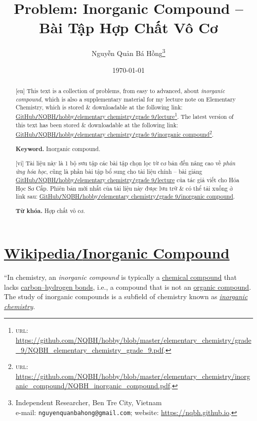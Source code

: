 \documentclass{article}
\title{Problem: Inorganic Compound -- Bài Tập Hợp Chất Vô Cơ}
\author{Nguyễn Quản Bá Hồng\footnote{Independent Researcher, Ben Tre City, Vietnam\\e-mail: \texttt{nguyenquanbahong@gmail.com}; website: \url{https://nqbh.github.io}.}}
\date{\today}
\begin{document}
\maketitle
\begin{abstract}
	\textsf{[en]} This text is a collection of problems, from easy to advanced, about \textit{inorganic compound}, which is also a supplementary material for my lecture note on Elementary Chemistry, which is stored \& downloadable at the following link: \href{https://github.com/NQBH/hobby/blob/master/elementary_chemistry/grade_9/NQBH_elementary_chemistry_grade_9.pdf}{GitHub\texttt{/}NQBH\texttt{/}hobby\texttt{/}elementary chemistry\texttt{/}grade 9\texttt{/}lecture}\footnote{\textsc{url}: \url{https://github.com/NQBH/hobby/blob/master/elementary_chemistry/grade_9/NQBH_elementary_chemistry_grade_9.pdf}.}. The latest version of this text has been stored \& downloadable at the following link: \href{https://github.com/NQBH/hobby/blob/master/elementary_chemistry/inorganic_compound/NQBH_inorganic_compound.pdf}{GitHub\texttt{/}NQBH\texttt{/}hobby\texttt{/}elementary chemistry\texttt{/}grade 9\texttt{/}inorganic compound}\footnote{\textsc{url}: \url{https://github.com/NQBH/hobby/blob/master/elementary_chemistry/inorganic_compound/NQBH_inorganic_compound.pdf}.}.
	
	\textsf{\textbf{Keyword.} Inorganic compound.}
	\vspace{2mm}
	
	\textsf{[vi]} Tài liệu này là 1 bộ sưu tập các bài tập chọn lọc từ cơ bản đến nâng cao về \textit{phản ứng hóa học}, cũng là phần bài tập bổ sung cho tài liệu chính -- bài giảng \href{https://github.com/NQBH/hobby/blob/master/elementary_chemistry/grade_9/NQBH_elementary_chemistry_grade_9.pdf}{GitHub\texttt{/}NQBH\texttt{/}hobby\texttt{/}elementary chemistry\texttt{/}grade 9\texttt{/}lecture} của tác giả viết cho Hóa Học Sơ Cấp. Phiên bản mới nhất của tài liệu này được lưu trữ \& có thể tải xuống ở link sau: \href{https://github.com/NQBH/hobby/blob/master/elementary_chemistry/grade_9/real/NQBH_real.pdf}{GitHub\texttt{/}NQBH\texttt{/}hobby\texttt{/}elementary chemistry\texttt{/}grade 9\texttt{/}inorganic compound}.
	
	\textsf{\textbf{Từ khóa.} Hợp chất vô cơ.}
\end{abstract}
\setcounter{secnumdepth}{4}
\setcounter{tocdepth}{3}
\tableofcontents
\newpage


\section{\href{https://en.wikipedia.org/wiki/Inorganic_compound}{Wikipedia\texttt{/}Inorganic Compound}}
``In chemistry, an \textit{inorganic compound} is typically a \href{https://en.wikipedia.org/wiki/Chemical_compound}{chemical compound} that lacks \href{https://en.wikipedia.org/wiki/Carbon%E2%90%93hydrogen_bond}{carbon--hydrogen bonds}, i.e., a compound that is not an \href{https://en.wikipedia.org/wiki/Organic_compound}{organic compound}. The study of inorganic compounds is a subfield of chemistry known as \href{https://en.wikipedia.org/wiki/Inorganic_chemistry}{\textit{inorganic chemistry}}.
\end{document}
